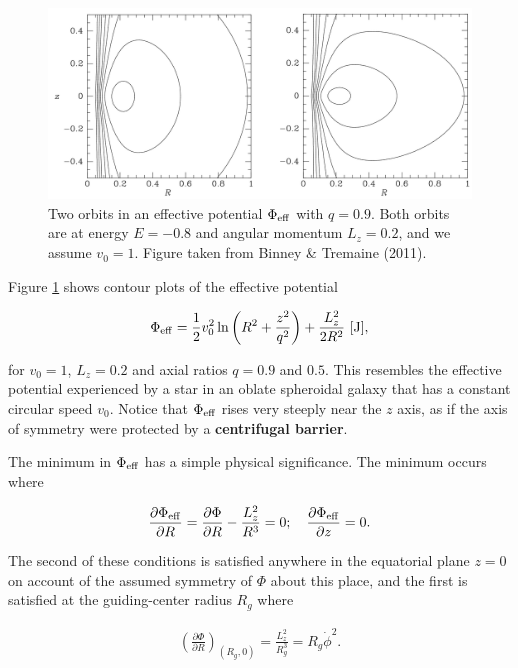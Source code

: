 \documentclass[a4paper,10pt]{article}
\begin{document}
\begin{figure}[t]
    \centering
    \includegraphics[width=16cm]{figures/EffPot.png}
    \caption{\footnotesize{Two orbits in an effective potential $\Phi_{\rm eff}$ with $q=0.9$. Both orbits are at energy $E=−0.8$ and angular momentum $L_z=0.2$, and we assume $v_0=1$. Figure taken from Binney \& Tremaine (2011).}}
    \label{fig:effpot}
\end{figure}

{\noindent}Figure \ref{fig:effpot} shows contour plots of the effective potential

\begin{align*}
    \Phi_{\rm eff} = \frac{1}{2}v_0^2\ln \left(R^2 + \frac{z^2}{q^2}\right) + \frac{L_z^2}{2R^2} ~ [{\rm J}],
\end{align*}

{\noindent}for $v_0=1$, $L_z=0.2$ and axial ratios $q=0.9$ and $0.5$. This resembles the effective potential experienced by a star in an oblate spheroidal galaxy that has a constant circular speed $v_0$. Notice that $\Phi_{\rm eff}$ rises very steeply near the $z$ axis, as if the axis of symmetry were protected by a \textbf{centrifugal barrier}.

{\noindent}The minimum in $\Phi_{\rm eff}$ has a simple physical significance. The minimum occurs where

\begin{align*}
    \frac{\partial\Phi_{\rm eff}}{\partial R} = \frac{\partial\Phi}{\partial R} - \frac{L_z^2}{R^3} = 0; ~~~ \frac{\partial\Phi_{\rm eff}}{\partial z} = 0.
\end{align*}

{\noindent}The second of these conditions is satisfied anywhere in the equatorial plane $z=0$ on account of the assumed symmetry of $\Phi$ about this place, and the first is satisfied at the guiding-center radius $R_g$ where

\begin{align*}
    \left(\frac{\partial\Phi}{\partial R}\right)_{(R_g,0)} = \frac{L_z^2}{R_g^3} = R_g\dot{\phi}^2.
\end{align*}
\end{document}
